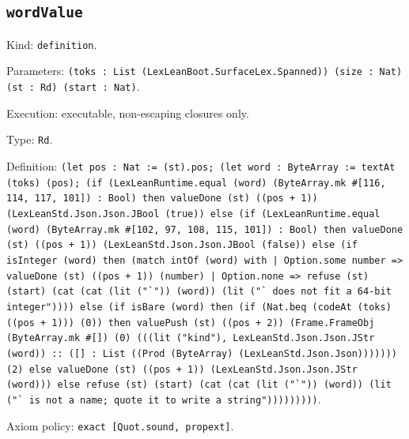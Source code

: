 \documentclass[11pt]{article}
\begin{document}
\subsection*{\texttt{wordValue}}
\noindent Kind: \texttt{definition}.\par
\noindent Parameters: \texttt{(toks : List (LexLeanBoot.SurfaceLex.Spanned)) (size : Nat) (st : Rd) (start : Nat)}.\par
\noindent Execution: executable, non-escaping closures only.\par
\noindent Type: \texttt{Rd}.\par
\noindent Definition: \texttt{(let pos : Nat := (st).pos; (let word : ByteArray := textAt (toks) (pos); (if (LexLeanRuntime.equal (word) (ByteArray.mk \#[116, 114, 117, 101]) : Bool) then valueDone (st) ((pos + 1)) (LexLeanStd.Json.Json.JBool (true)) else (if (LexLeanRuntime.equal (word) (ByteArray.mk \#[102, 97, 108, 115, 101]) : Bool) then valueDone (st) ((pos + 1)) (LexLeanStd.Json.Json.JBool (false)) else (if isInteger (word) then (match intOf (word) with | Option.some number => valueDone (st) ((pos + 1)) (number) | Option.none => refuse (st) (start) (cat (cat (lit ("`")) (word)) (lit ("` does not fit a 64-bit integer")))) else (if isBare (word) then (if (Nat.beq (codeAt (toks) ((pos + 1))) (0)) then valuePush (st) ((pos + 2)) (Frame.FrameObj (ByteArray.mk \#[]) (0) (((lit ("kind"), LexLeanStd.Json.Json.JStr (word)) :: ([] : List ((Prod (ByteArray) (LexLeanStd.Json.Json))))))) (2) else valueDone (st) ((pos + 1)) (LexLeanStd.Json.Json.JStr (word))) else refuse (st) (start) (cat (cat (lit ("`")) (word)) (lit ("` is not a name; quote it to write a string")))))))))}.\par
\noindent Axiom policy: \texttt{exact [Quot.sound, propext]}.\par
\end{document}
